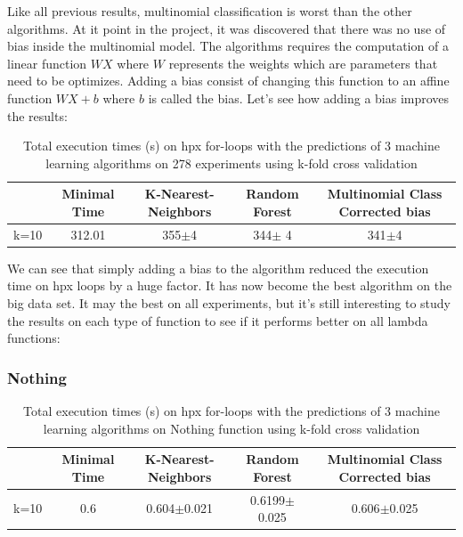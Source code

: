Like all previous results, multinomial classification is worst than the other algorithms. At it point in the project, it was discovered that there was no use of bias inside the multinomial model. The algorithms requires the computation of a linear function $W X$ where $W$ represents the weights which are parameters that need to be optimizes. Adding a bias consist of changing this function to an affine function $WX+b$ where $b$ is called the bias. Let's see how adding a bias improves the results:

\begin{table}[h]
	\centering
	\caption{Total execution times (s) on hpx for-loops with the predictions of 3 machine learning algorithms on 278 experiments using k-fold cross validation}
	\label{my-label}
	\begin{tabular}{|c|c|c|c|c|}
		\hline
		& Minimal Time&K-Nearest-Neighbors & Random Forest &Multinomial Class Corrected bias\\ \hline
		k=10  &312.01&
		355$\pm$4        & 344$\pm$ 4&341$\pm$4 \\ \hline
	\end{tabular}
\end{table}
We can see that simply adding a bias to the algorithm reduced the execution time on hpx loops by a huge factor. It has now become the best algorithm on the big data set. It may the best on all experiments, but it's still interesting to study the results on each type of function to see if it performs better on all lambda functions:
\newpage
\subsubsection{Nothing}

\begin{table}[h]
	\centering
	\caption{Total execution times (s) on hpx for-loops with the predictions of 3 machine learning algorithms on Nothing function using k-fold cross validation}
	\label{my-label}
	\begin{tabular}{|c|c|c|c|c|}
		\hline
		& Minimal Time&K-Nearest-Neighbors & Random Forest &Multinomial Class Corrected bias\\ \hline
		k=10  &0.6&
		0.604$\pm$0.021       & 0.6199$\pm$0.025&0.606$\pm$0.025 \\ \hline
	\end{tabular}
\end{table}

